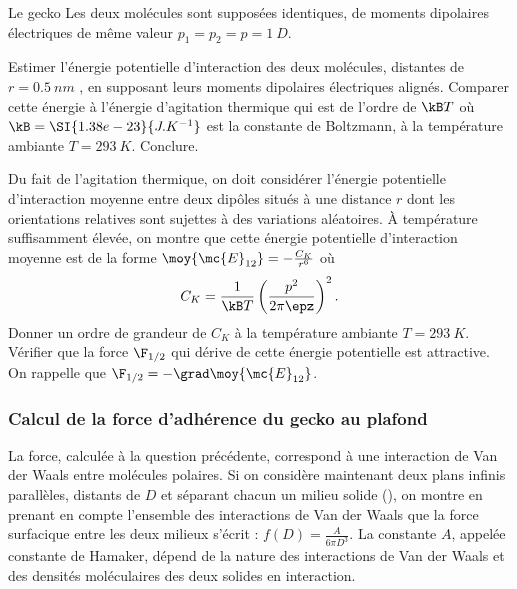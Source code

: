 \begin{exo}[PC][2][devoir]{Le gecko}
Les deux molécules sont supposées identiques, de moments dipolaires électriques de même valeur
$p_1 = p_2 = p = \SI{1}{D}$.

\begin{quest}
  \question  Estimer l’énergie potentielle d’interaction des deux molécules, distantes de $r = \SI{0.5}{nm}$ , en
supposant leurs moments dipolaires électriques alignés. Comparer cette énergie à l’énergie
d’agitation thermique qui est de l’ordre de $\kB T$ où $\kB=\SI{1.38e-23}{J.K^{-1}}$ est la constante de Boltzmann, à la température ambiante $T = \SI{293}{K}$. Conclure.


\question Du fait de l’agitation thermique, on doit considérer l’énergie potentielle d’interaction moyenne entre deux dipôles situés à une distance $r$ dont les orientations relatives sont
sujettes à des variations aléatoires. À température suffisamment élevée, on montre que cette
énergie potentielle d’interaction moyenne est de la forme $\moy{\mc{E}_{12}}=-\frac{C_K}{r^6}$ où
\begin{equation}
  C_K = \frac{1}{\kB T}\left(\frac{p^2}{2\pi \epz} \right)^2.
\end{equation}
Donner un ordre de grandeur de $C_K$ à la température ambiante $T = \SI{293}{K}$. Vérifier que la force $\F_{1/2}$ qui dérive de cette énergie potentielle est attractive. On rappelle que $\F_{1/2} = - \grad \moy{\mc{E}_{12}}$.
\end{quest}

\subsubsection{Calcul de la force d’adhérence du gecko au plafond}

La force, calculée à la question précédente, correspond à une interaction de Van der Waals entre
molécules polaires. Si on considère maintenant deux plans infinis parallèles, distants de $D$ et
séparant chacun un milieu solide (), on montre en prenant en compte l’ensemble des
interactions de Van der Waals que la force surfacique entre les deux milieux s’écrit : $f ( D ) = \frac{A}{6\pi D^3}$. La constante $A$, appelée constante de Hamaker, dépend de la nature des interactions de Van der
Waals et des densités moléculaires des deux solides en interaction.


\end{exo}
